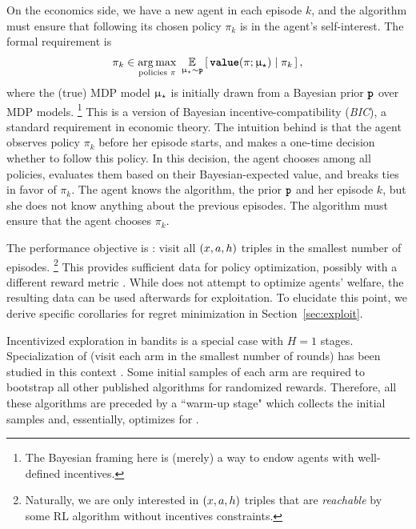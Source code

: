 On the economics side, we have a new agent in each episode $k$, and the algorithm must ensure that following its chosen policy $\pi_k$ is in the agent's self-interest. The formal requirement is
\begin{align}\label{eq:greedy-intro}
\pi_k \in \operatorname*{arg\,max}_{\text{policies $\pi$}}\;
    \operatorname*{\mathbb{E}}_{\upmu_{\star}\sim{\normalfont \texttt{\textbf{p}}}}\left[\, {\normalfont \texttt{\textbf{value}}}(\pi;\upmu_{\star}) \mid \pi_k\,\right],
\end{align}
where the (true) MDP model $\upmu_{\star}$ is initially drawn from a Bayesian prior ${\normalfont \texttt{\textbf{p}}}$ over MDP models.
\footnote{The Bayesian framing here is (merely) a way to endow agents with well-defined incentives.}
This is a version of Bayesian incentive-compatibility (\emph{BIC}), a standard requirement in economic theory. The intuition behind  is that the agent observes policy $\pi_k$ before her episode starts, and makes a one-time decision whether to follow this policy. In this decision, the agent chooses among all policies, evaluates them based on their Bayesian-expected value, and breaks ties in favor of $\pi_k$. The agent knows the algorithm, the prior ${\normalfont \texttt{\textbf{p}}}$ and her episode $k$, but she does not know anything about the previous episodes. The algorithm must ensure that the agent chooses $\pi_k$.

The performance objective is \traversal: visit all $(x,a,h)$ triples in the smallest number of episodes.%
\footnote{Naturally, we are only interested in $(x,a,h)$ triples that are \emph{reachable} by some RL algorithm without incentives constraints.} This  provides sufficient data for policy optimization, possibly with a different reward metric \citep{jin2020reward}.
While \traversal does not attempt to optimize agents' welfare, the resulting data can be used afterwards for exploitation. To elucidate this point, we derive specific corollaries for regret minimization in Section~\ref{sec:exploit}.

Incentivized exploration in bandits is a special case with $H=1$ stages. Specialization of \traversal (visit each arm in the smallest number of rounds) has been studied in this context  \citep[\eg][]{ICexploration-ec15,Selke-PoIE-ec21}. Some initial samples of each arm are required to bootstrap all other published algorithms for randomized rewards. Therefore, all these algorithms are preceded by a ``warm-up stage" which collects the initial samples and, essentially, optimizes for \traversal.
